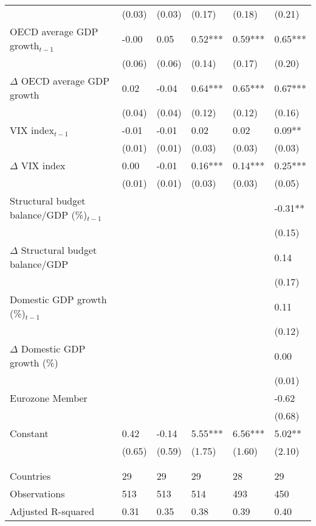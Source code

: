 {\begin{tabular}{lp{2cm}p{2cm}p{2cm}p{2cm}p{2cm}}
   & (0.03) & (0.03) & (0.17) & (0.18) & (0.21) \\ 
  OECD average GDP growth$_{t-1}$ & -0.00 & 0.05 & 0.52*** & 0.59*** & 0.65*** \\ 
   & (0.06) & (0.06) & (0.14) & (0.17) & (0.20) \\ 
  $\Delta$ OECD average GDP growth & 0.02 & -0.04 & 0.64*** & 0.65*** & 0.67*** \\ 
   & (0.04) & (0.04) & (0.12) & (0.12) & (0.16) \\ 
  VIX index$_{t-1}$ & -0.01 & -0.01 & 0.02 & 0.02 & 0.09** \\ 
   & (0.01) & (0.01) & (0.03) & (0.03) & (0.03) \\ 
  $\Delta$ VIX index & 0.00 & -0.01 & 0.16*** & 0.14*** & 0.25*** \\ 
   & (0.01) & (0.01) & (0.03) & (0.03) & (0.05) \\ 
  Structural budget balance/GDP (\%)$_{t-1}$ &  &  &  &  & -0.31** \\ 
   &  &  &  &  & (0.15) \\ 
  $\Delta$ Structural budget balance/GDP &  &  &  &  & 0.14 \\ 
   &  &  &  &  & (0.17) \\ 
  Domestic GDP growth (\%)$_{t-1}$ &  &  &  &  & 0.11 \\ 
   &  &  &  &  & (0.12) \\ 
  $\Delta$ Domestic GDP growth (\%) &  &  &  &  & 0.00 \\ 
   &  &  &  &  & (0.01) \\ 
  Eurozone Member &  &  &  &  & -0.62 \\ 
   &  &  &  &  & (0.68) \\ 
  Constant & 0.42 & -0.14 & 5.55*** & 6.56*** & 5.02** \\ 
   & (0.65) & (0.59) & (1.75) & (1.60) & (2.10) \\ 
   &  &  &  &  &  \\ 
   &  &  &  &  &  \\ 
  Countries & 29 & 29 & 29 & 28 & 29 \\ 
  Observations & 513 & 513 & 514 & 493 & 450 \\ 
  Adjusted R-squared & 0.31 & 0.35 & 0.38 & 0.39 & 0.40 \\ 
   \hline
\end{tabular}
}
